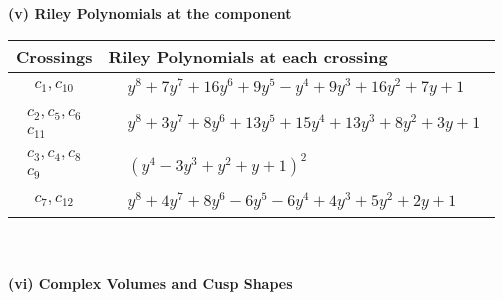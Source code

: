 \documentclass[1p]{elsarticle_modified}
\theoremstyle{definition}
\begin{document}
\newpage\renewcommand{\arraystretch}{1}
\flushleft \textbf{(v) Riley Polynomials at the component}\newline \\
\begin{tabular}{m{50pt}|m{274pt}}
Crossings & \hspace{64pt}Riley Polynomials at each crossing \\
\hline $$\begin{aligned}c_{1},c_{10}\end{aligned}$$&$\begin{aligned}
&y^8+7 y^7+16 y^6+9 y^5- y^4+9 y^3+16 y^2+7 y+1
\end{aligned}$\\
\hline $$\begin{aligned}c_{2},c_{5},c_{6}\\c_{11}\end{aligned}$$&$\begin{aligned}
&y^8+3 y^7+8 y^6+13 y^5+15 y^4+13 y^3+8 y^2+3 y+1
\end{aligned}$\\
\hline $$\begin{aligned}c_{3},c_{4},c_{8}\\c_{9}\end{aligned}$$&$\begin{aligned}
&(y^4-3 y^3+y^2+y+1)^2
\end{aligned}$\\
\hline $$\begin{aligned}c_{7},c_{12}\end{aligned}$$&$\begin{aligned}
&y^8+4 y^7+8 y^6-6 y^5-6 y^4+4 y^3+5 y^2+2 y+1
\end{aligned}$\\
\hline
\end{tabular}\\~\\
\newpage\flushleft \textbf{(vi) Complex Volumes and Cusp Shapes}
\end{document}
